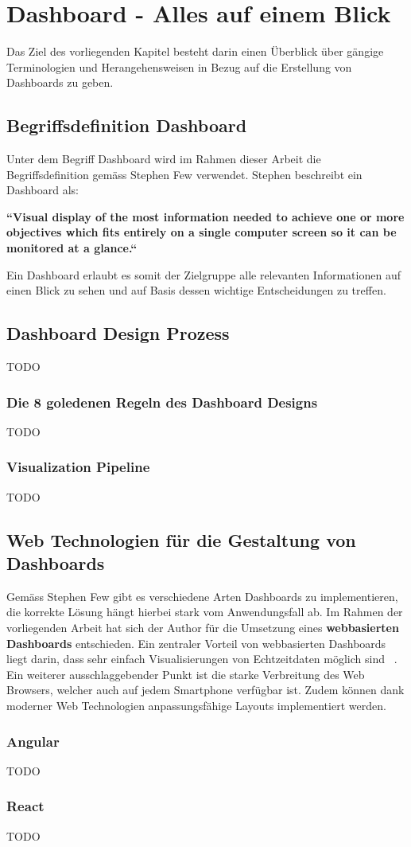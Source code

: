 \section{Dashboard - Alles auf einem Blick}
Das Ziel des vorliegenden Kapitel besteht darin einen Überblick über gängige Terminologien und Herangehensweisen in Bezug auf die Erstellung von Dashboards zu geben. 

\subsection{Begriffsdefinition Dashboard}
Unter dem Begriff Dashboard wird im Rahmen dieser Arbeit die Begriffsdefinition gemäss Stephen Few verwendet. Stephen beschreibt ein Dashboard als:
\begin{center}
\textbf{``Visual display of the most information needed to achieve one or more objectives which fits entirely on a single computer screen so it can be monitored at a glance.``} ~\citep[S. 26]{information_dashboard_design}  
\end{center}

Ein Dashboard erlaubt es somit der Zielgruppe alle relevanten Informationen auf einen Blick zu sehen und auf Basis dessen wichtige Entscheidungen zu treffen.

\subsection{Dashboard Design Prozess}
TODO


\subsubsection{Die 8 goledenen Regeln des Dashboard Designs}
TODO


\subsubsection{Visualization Pipeline}
TODO

\subsection{Web Technologien für die Gestaltung von Dashboards}
Gemäss Stephen Few gibt es verschiedene Arten Dashboards zu implementieren, die korrekte Lösung hängt hierbei stark vom Anwendungsfall ab. Im Rahmen der vorliegenden Arbeit hat sich der Author für die Umsetzung eines \textbf{webbasierten Dashboards} entschieden. Ein zentraler Vorteil von webbasierten Dashboards liegt darin, dass sehr einfach Visualisierungen von Echtzeitdaten möglich sind ~\citep[S. 27]{information_dashboard_design}. Ein weiterer ausschlaggebender Punkt ist die starke Verbreitung des Web Browsers, welcher auch auf jedem Smartphone verfügbar ist. Zudem können dank moderner Web Technologien anpassungsfähige Layouts implementiert werden.

\subsubsection{Angular}
TODO

\subsubsection{React}
TODO
